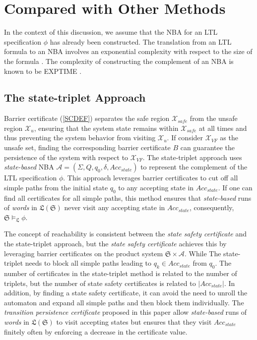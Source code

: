 \documentclass[acmlarge]{acmart}
\begin{document}
\section{Compared with Other Methods}
In the context of this discussion, we assume that the NBA for an LTL specification $\phi$ has already been constructed. The translation from an LTL formula to an NBA involves an exponential complexity with respect to the size of the formula \cite{vardi2005automata}. The complexity of constructing the complement of an NBA is known to be EXPTIME \cite{complementnba}.
\subsection{The state-triplet Approach}
Barrier certificate (\ref{SCDEF}) separates the safe region $\mathcal{X}_{safe}$ from the unsafe region $\mathcal{X}_{u}$, ensuring that the system state remains within $\mathcal{X}_{safe}$ at all times and thus preventing the system behavior from visiting $\mathcal{X}_{u}$. If consider $\mathcal{X}_{VF}$ as the unsafe set, finding the corresponding barrier certificate $B$ can guarantee the persistence of the system with respect to $\mathcal{X}_{VF}$. The state-triplet approach uses \emph{state-based} NBA $\mathcal{A} = (\Sigma, Q, q_0, \delta, Acc_{state})$ to represent the complement of the LTL specification $\phi$. This approach leverages barrier certificates to cut off all simple paths from the initial state \(q_0\) to any accepting state in $Acc_{state}$. If one can find all certificates for all simple paths, this method ensures that \emph{state-based} runs of \emph{words} in $\mathfrak{L}(\mathfrak{S})$ never visit any accepting state in $Acc_{state}$, consequently, \(\mathfrak{S} \models_{\mathfrak{L}} \phi\).

The concept of reachability is consistent between the \emph{state safety certificate} and the state-triplet approach, but the \emph{state safety certificate} achieves this by leveraging barrier certificates on the product system $\mathfrak{S} \times \mathcal{A}$. While The state-triplet needs to block all simple paths leading to $q_k \in Acc_{state}$ from $q_0$. The number of certificates in the state-triplet method is related to the number of triplets, but the number of state safety certificates is related to $|Acc_{state}|$. In addition, by finding a state safety certificate, it can avoid the need to unroll the automaton and expand all simple paths and then block them individually. The \emph{transition persistence certificate} proposed in this paper allow \emph{state-based} runs of \emph{words} in $\mathfrak{L}(\mathfrak{S})$ to visit accepting states but ensures that they visit $Acc_{state}$ finitely often by enforcing a decrease in the certificate value.
\end{document}
